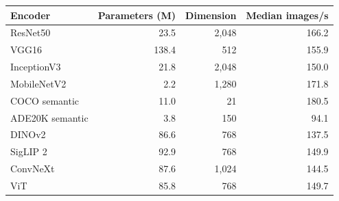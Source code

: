 \begin{tabular}{lrrr}
\toprule
Encoder & Parameters (M) & Dimension & Median images/s\\
\midrule
ResNet50 & 23.5 & 2,048 & 166.2\\
VGG16 & 138.4 & 512 & 155.9\\
InceptionV3 & 21.8 & 2,048 & 150.0\\
MobileNetV2 & 2.2 & 1,280 & 171.8\\
COCO semantic & 11.0 & 21 & 180.5\\
ADE20K semantic & 3.8 & 150 & 94.1\\
DINOv2 & 86.6 & 768 & 137.5\\
SigLIP 2 & 92.9 & 768 & 149.9\\
ConvNeXt & 87.6 & 1,024 & 144.5\\
ViT & 85.8 & 768 & 149.7\\
\bottomrule
\end{tabular}
